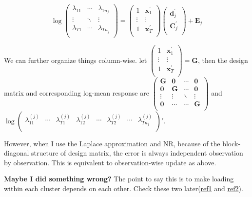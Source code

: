 \documentclass[]{article}
\begin{document}
\[\log\begin{pmatrix}
	\lambda_{11} & \cdots & \lambda_{1n_{j}} \\
	\vdots & \ddots & \vdots \\
	\lambda_{T1} & \cdots & \lambda_{Tn_{j}} \\
\end{pmatrix} = \begin{pmatrix}
	1 & \mathbf{x}_{1}^{'} \\
	\vdots & \vdots \\
	1 & \mathbf{x}_{T}^{'} \\
\end{pmatrix}\begin{pmatrix}
	\mathbf{d}_{j}^{'} \\
	\mathbf{C}_{j}^{'} \\
\end{pmatrix} + \mathbf{E}_j\]

We can further organize things column-wise. let \(\begin{pmatrix}
	1 & \mathbf{x}_{1}^{'} \\
	\vdots & \vdots \\
	1 & \mathbf{x}_{T}^{'} \\
\end{pmatrix} = \mathbf{G}\), then the design matrix and corresponding log-mean response are \(\begin{pmatrix}
\mathbf{G} & \mathbf{0} & \cdots & \mathbf{0} \\
\mathbf{0} & \mathbf{G} & \cdots & \mathbf{0} \\
\vdots & \vdots & \ddots & \vdots \\
\mathbf{0} & \cdots & \cdots & \mathbf{G} \\
\end{pmatrix}\) and \({\log\begin{pmatrix}
	\lambda_{11}^{(j)} & \cdots & \lambda_{T1}^{(j)} & \lambda_{12}^{(j)} & \cdots & \lambda_{T2}^{(j)} & \cdots & \lambda_{Tn_{j}}^{(j)} \\
\end{pmatrix}}'\).

However, when I use the Laplace approximation and NR, because of the block-diagonal structure of design matrix, the error is always independent observation by observation. This is equivalent to observation-wise update as above.

\textbf{Maybe I did something wrong?}
The point to say this is to make loading within each cluster depends on each other. Check these two later(\href{https://www.tandfonline.com/doi/full/10.1080/03610926.2012.743565?journalCode=lsta20}{ref1} and \href{https://www.tandfonline.com/doi/full/10.1080/02664763.2021.1877637?src=recsys}{ref2}).
\end{document}
